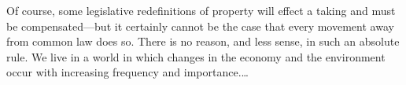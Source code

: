 Of course, some legislative redefinitions of property will effect a taking and
must be compensated---but it certainly cannot be the case that every movement
away from common law does so. There is no reason, and less sense, in such an
absolute rule. We live in a world in which changes in the economy and the
environment occur with increasing frequency and importance.\ldots


%
%
%

